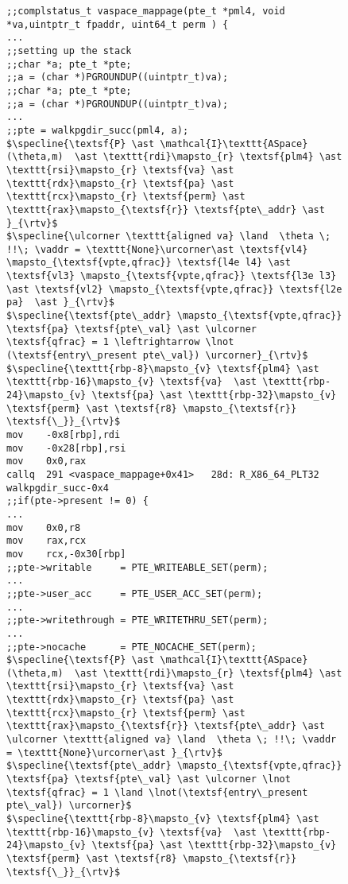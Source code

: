 \begin{figure}\footnotesize
  \begin{lstlisting}[mathescape]
;;complstatus_t vaspace_mappage(pte_t *pml4, void *va,uintptr_t fpaddr, uint64_t perm ) {
...
;;setting up the stack      
;;char *a; pte_t *pte;
;;a = (char *)PGROUNDUP((uintptr_t)va);
;;char *a; pte_t *pte;
;;a = (char *)PGROUNDUP((uintptr_t)va);
...
;;pte = walkpgdir_succ(pml4, a);
$\specline{\textsf{P} \ast \mathcal{I}\texttt{ASpace}(\theta,m)  \ast \texttt{rdi}\mapsto_{r} \textsf{plm4} \ast \texttt{rsi}\mapsto_{r} \textsf{va} \ast  \texttt{rdx}\mapsto_{r} \textsf{pa} \ast \texttt{rcx}\mapsto_{r} \textsf{perm} \ast \texttt{rax}\mapsto_{\textsf{r}} \textsf{pte\_addr} \ast }_{\rtv}$
$\specline{\ulcorner \texttt{aligned va} \land  \theta \; !!\; \vaddr = \texttt{None}\urcorner\ast \textsf{vl4} \mapsto_{\textsf{vpte,qfrac}} \textsf{l4e l4} \ast \textsf{vl3} \mapsto_{\textsf{vpte,qfrac}} \textsf{l3e l3} \ast \textsf{vl2} \mapsto_{\textsf{vpte,qfrac}} \textsf{l2e pa}  \ast }_{\rtv}$
$\specline{\textsf{pte\_addr} \mapsto_{\textsf{vpte,qfrac}} \textsf{pa} \textsf{pte\_val} \ast \ulcorner  \textsf{qfrac} = 1 \leftrightarrow \lnot (\textsf{entry\_present pte\_val}) \urcorner}_{\rtv}$     
$\specline{\texttt{rbp-8}\mapsto_{v} \textsf{plm4} \ast \texttt{rbp-16}\mapsto_{v} \textsf{va}  \ast \texttt{rbp-24}\mapsto_{v} \textsf{pa} \ast \texttt{rbp-32}\mapsto_{v} \textsf{perm} \ast \textsf{r8} \mapsto_{\textsf{r}} \textsf{\_}}_{\rtv}$      
mov    -0x8[rbp],rdi
mov    -0x28[rbp],rsi
mov    0x0,rax
callq  291 <vaspace_mappage+0x41>	28d: R_X86_64_PLT32	walkpgdir_succ-0x4
;;if(pte->present != 0) {
...        
mov    0x0,r8
mov    rax,rcx
mov    rcx,-0x30[rbp]
;;pte->writable     = PTE_WRITEABLE_SET(perm);
...
;;pte->user_acc     = PTE_USER_ACC_SET(perm);
...
;;pte->writethrough = PTE_WRITETHRU_SET(perm);
...
;;pte->nocache      = PTE_NOCACHE_SET(perm);
$\specline{\textsf{P} \ast \mathcal{I}\texttt{ASpace}(\theta,m)  \ast \texttt{rdi}\mapsto_{r} \textsf{plm4} \ast \texttt{rsi}\mapsto_{r} \textsf{va} \ast  \texttt{rdx}\mapsto_{r} \textsf{pa} \ast \texttt{rcx}\mapsto_{r} \textsf{perm} \ast \texttt{rax}\mapsto_{\textsf{r}} \textsf{pte\_addr} \ast \ulcorner \texttt{aligned va} \land  \theta \; !!\; \vaddr = \texttt{None}\urcorner\ast }_{\rtv}$
$\specline{\textsf{pte\_addr} \mapsto_{\textsf{vpte,qfrac}} \textsf{pa} \textsf{pte\_val} \ast \ulcorner \lnot \textsf{qfrac} = 1 \land \lnot(\textsf{entry\_present pte\_val}) \urcorner}$     
$\specline{\texttt{rbp-8}\mapsto_{v} \textsf{plm4} \ast \texttt{rbp-16}\mapsto_{v} \textsf{va}  \ast \texttt{rbp-24}\mapsto_{v} \textsf{pa} \ast \texttt{rbp-32}\mapsto_{v} \textsf{perm} \ast \textsf{r8} \mapsto_{\textsf{r}} \textsf{\_}}_{\rtv}$      

\end{lstlisting}
\end{figure}
